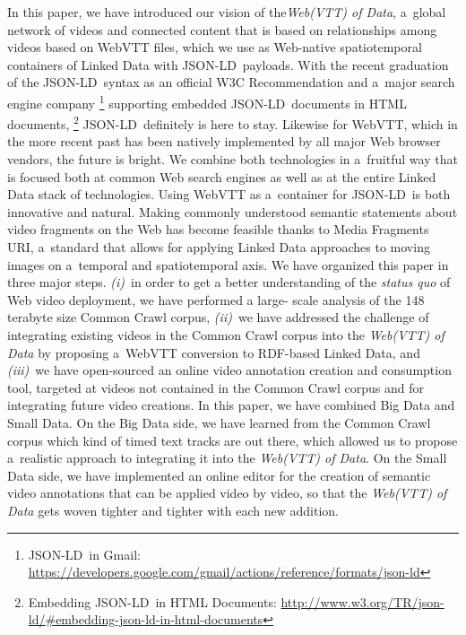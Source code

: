 \documentclass{sig-alternate}
\newcommand{\inlinelistingsize}{\fontsize{8pt}{11pt}}
\let\oldurl\url
\renewcommand{\url}[1]{\inlinelistingsize\oldurl{#1}}
\def\JSONLD{\mbox{JSON-LD}}
\begin{document}
In this paper, we have introduced our vision of the\linebreak \emph{Web(VTT) of Data},
a~global network of videos and connected content
that is based on relationships among videos based on WebVTT files,
which we use as Web-native spatiotemporal containers of Linked Data
with \JSONLD\ payloads.
With the recent graduation of the \JSONLD\ syntax
as an official W3C Recommendation and a~major search engine company%
\footnote{\JSONLD\ in Gmail:
\url{https://developers.google.com/gmail/actions/reference/formats/json-ld}}
supporting embedded \JSONLD\ documents in HTML documents,%
\footnote{Embedding \JSONLD\ in HTML Documents:
\url{http://www.w3.org/TR/json-ld/\#embedding-json-ld-in-html-documents}}
\JSONLD\ definitely is here to stay.
Likewise for WebVTT, which in the more recent past has been natively implemented
by all major Web browser vendors,
the future is bright.
We combine both technologies in a~fruitful way that is focused
both at common Web search engines
as well as at the entire Linked Data stack of technologies.
Using WebVTT as a~container for \JSONLD\ is both innovative and natural.
Making commonly understood semantic statements about video fragments on the Web
has become feasible thanks to Media Fragments URI,
a~standard that allows for applying Linked Data approaches to moving images
on a~temporal and spatiotemporal axis.
We have organized this paper in three major steps.
\emph{(i)}~in order to get a better understanding of the \emph{status quo}
of Web video deployment, we have performed a large- scale analysis
of the 148 terabyte size Common Crawl corpus,
\emph{(ii)}~we have addressed the challenge of integrating
existing videos in the Common Crawl corpus into the \emph{Web(VTT) of Data}
by proposing a~WebVTT conversion to RDF-based Linked Data,
and \emph{(iii)}~we have open-sourced an online video annotation creation
and consumption tool, targeted at videos not contained in the Common Crawl corpus
and for integrating future video creations.
In this paper, we have combined Big Data and Small Data.
On the Big Data side, we have learned from the Common Crawl corpus
which kind of timed text tracks are out there,
which allowed us to propose a~realistic approach to integrating it
into the \emph{Web(VTT) of Data}.
On the Small Data side, we have implemented an online editor for the creation
of semantic video annotations that can be applied video by video,
so that the \emph{Web(VTT) of Data} gets woven tighter and tighter with each new addition.
\end{document}
